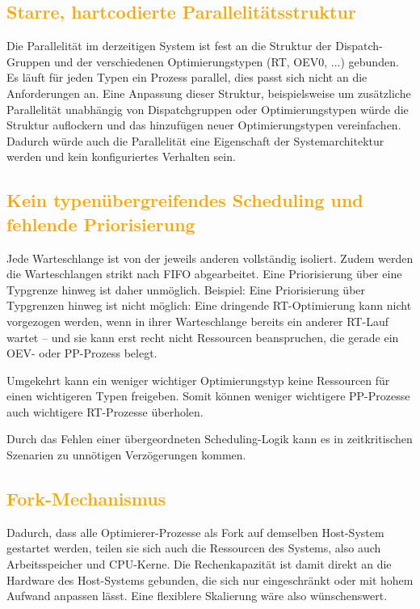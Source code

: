 \documentclass[
    12pt,               
    a4paper,            
    ngerman,            
    parskip=half,       
    headings=normal,   
    numbers=enddot,     
    toc=chapterentrywithdots 
]{scrreprt}\usepackage[utf8]{inputenc}
\begin{document}
\subsection{\textcolor{orange}{Starre, hartcodierte Parallelitätsstruktur}}
Die Parallelität im derzeitigen System ist fest an die Struktur der Dispatch-Gruppen und der verschiedenen Optimierungstypen (RT, OEV0, ...) gebunden. Es läuft für jeden Typen ein Prozess parallel, dies passt sich nicht an die Anforderungen an. Eine Anpassung dieser Struktur, beispielsweise um zusätzliche Parallelität unabhängig von Dispatchgruppen oder Optimierungstypen würde die Struktur auflockern und das hinzufügen neuer Optimierungstypen vereinfachen. Dadurch würde auch die Parallelität eine Eigenschaft der Systemarchitektur werden und kein konfiguriertes Verhalten sein.

\subsection{\textcolor{orange}{Kein typenübergreifendes Scheduling und fehlende Priorisierung}}
Jede Warteschlange ist von der jeweils anderen vollständig isoliert. Zudem werden die Warteschlangen strikt nach FIFO abgearbeitet. Eine Priorisierung über eine Typgrenze hinweg ist daher unmöglich. Beispiel: Eine Priorisierung über Typgrenzen hinweg ist nicht möglich: Eine dringende RT-Optimierung kann nicht vorgezogen werden, wenn in ihrer Warteschlange bereits ein anderer RT-Lauf wartet – und sie kann erst recht nicht Ressourcen beanspruchen, die gerade ein OEV- oder PP-Prozess belegt.

Umgekehrt kann ein weniger wichtiger Optimierungstyp keine Ressourcen für einen wichtigeren Typen freigeben. Somit können weniger wichtigere PP-Prozesse auch wichtigere RT-Prozesse überholen.

Durch das Fehlen einer übergeordneten Scheduling-Logik kann es in zeitkritischen Szenarien zu unnötigen Verzögerungen kommen.

\subsection{\textcolor{orange}{Fork-Mechanismus}}
Dadurch, dass alle Optimierer-Prozesse als Fork auf demselben Host-System gestartet werden, teilen sie sich auch die Ressourcen des Systems, also auch Arbeitsspeicher und CPU-Kerne. Die Rechenkapazität ist damit direkt an die Hardware des Host-Systems gebunden, die sich nur eingeschränkt oder mit hohem Aufwand anpassen lässt. Eine flexiblere Skalierung wäre also wünschenswert.
\end{document}
